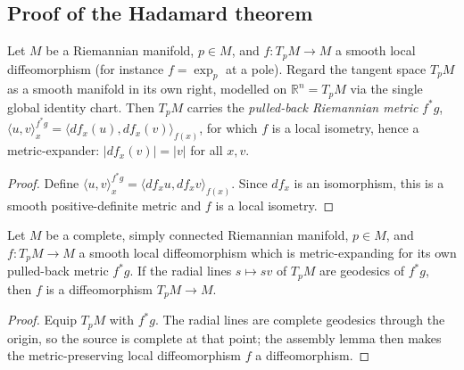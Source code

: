 \subsection{Proof of the Hadamard theorem}

\begin{lemma}

  \label{lem:dc-ch7-3-4-pullback-metric}
  \leanok
Let $M$ be a Riemannian manifold, $p\in M$, and $f:T_pM\to M$ a smooth local
  diffeomorphism (for instance $f=\exp_p$ at a pole). Regard the tangent space $T_pM$ as
  a smooth manifold in its own right, modelled on $\mathbb R^n=T_pM$ via the single global
  identity chart. Then $T_pM$ carries the \emph{pulled-back Riemannian metric} $f^*g$,
  $\langle u,v\rangle^{f^*g}_x=\langle df_x(u),df_x(v)\rangle_{f(x)}$, for which $f$ is a
  local isometry, hence a metric-expander: $|df_x(v)|=|v|$ for all $x,v$.
\end{lemma}
\begin{proof}

  \leanok
\sketch Define $\langle u,v\rangle^{f^*g}_x=\langle df_xu,df_xv\rangle_{f(x)}$. Since $df_x$ is an isomorphism, this is a smooth positive-definite metric and $f$ is a local isometry.
\end{proof}

\begin{lemma}

  \label{lem:dc-ch7-3-4-pole-diffeo}
  \leanok
Let $M$ be a complete, simply connected Riemannian manifold, $p\in M$, and $f:T_pM\to M$
  a smooth local diffeomorphism which is metric-expanding for its own pulled-back metric
  $f^*g$. If the radial lines $s\mapsto sv$ of $T_pM$ are geodesics of $f^*g$, then $f$ is a
  diffeomorphism $T_pM\to M$.
\end{lemma}
\begin{proof}

  \leanok
\sketch Equip $T_pM$ with $f^*g$. The radial lines are complete geodesics through the origin, so the source is complete at that point; the assembly lemma then makes the metric-preserving local diffeomorphism $f$ a diffeomorphism.
\end{proof}

